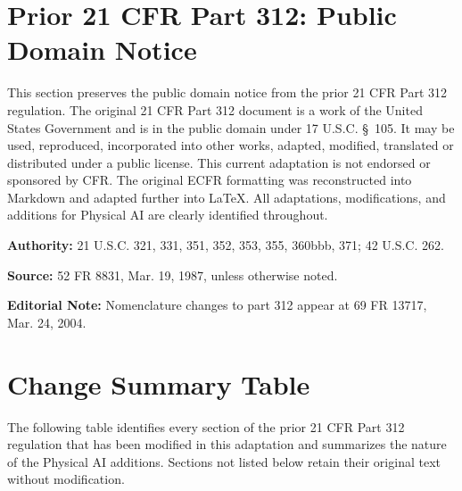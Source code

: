 \documentclass[11pt]{article}
\begin{document}
\clearpage
{}

\section*{Prior 21 CFR Part 312: Public Domain Notice}

This section preserves the public domain notice from the prior 21 CFR Part 312 regulation. The original 21 CFR Part 312 document is a work of the United States Government and is in the public domain under 17 U.S.C. \S~105. It may be used, reproduced, incorporated into other works, adapted, modified, translated or distributed under a public license. This current adaptation is not endorsed or sponsored by CFR. The original ECFR formatting was reconstructed into Markdown and adapted further into LaTeX. All adaptations, modifications, and additions for Physical AI are clearly identified throughout.

\textbf{Authority:} 21 U.S.C. 321, 331, 351, 352, 353, 355, 360bbb, 371; 42 U.S.C. 262.

\textbf{Source:} 52 FR 8831, Mar. 19, 1987, unless otherwise noted.

\textbf{Editorial Note:} Nomenclature changes to part 312 appear at 69 FR 13717, Mar. 24, 2004.

\clearpage

\section*{Change Summary Table}

The following table identifies every section of the prior 21 CFR Part 312 regulation that has been modified in this adaptation and summarizes the nature of the Physical AI additions. Sections not listed below retain their original text without modification.
\end{document}
